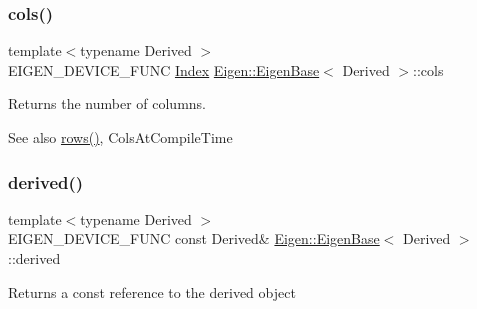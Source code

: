 \subsubsection{\texorpdfstring{cols()}{cols()}}
{\footnotesize\ttfamily template$<$typename Derived $>$ \\
E\+I\+G\+E\+N\+\_\+\+D\+E\+V\+I\+C\+E\+\_\+\+F\+U\+NC \mbox{\hyperlink{struct_eigen_1_1_eigen_base_a554f30542cc2316add4b1ea0a492ff02}{Index}} \mbox{\hyperlink{struct_eigen_1_1_eigen_base}{Eigen\+::\+Eigen\+Base}}$<$ Derived $>$\+::cols\hspace{0.3cm}{\ttfamily [inline]}}

\begin{DoxyReturn}{Returns}
the number of columns. 
\end{DoxyReturn}
\begin{DoxySeeAlso}{See also}
\mbox{\hyperlink{struct_eigen_1_1_eigen_base_a8141320ba8df384426c298b32b000d8e}{rows()}}, Cols\+At\+Compile\+Time 
\end{DoxySeeAlso}
\mbox{\label{class_eigen_1_1_dense_coeffs_base_3_01_derived_00_01_write_accessors_01_4_ad0cbee5e2dfef3bbe9db5e6d5fe12cc0}} 
\subsubsection{\texorpdfstring{derived()}{derived()}\hspace{0.1cm}{\footnotesize\ttfamily [1/2]}}
{\footnotesize\ttfamily template$<$typename Derived $>$ \\
E\+I\+G\+E\+N\+\_\+\+D\+E\+V\+I\+C\+E\+\_\+\+F\+U\+NC const Derived\& \mbox{\hyperlink{struct_eigen_1_1_eigen_base}{Eigen\+::\+Eigen\+Base}}$<$ Derived $>$\+::derived\hspace{0.3cm}{\ttfamily [inline]}}

\begin{DoxyReturn}{Returns}
a const reference to the derived object 
\end{DoxyReturn}
\mbox{\label{class_eigen_1_1_dense_coeffs_base_3_01_derived_00_01_write_accessors_01_4_a324b16961a11d2ecfd2d1b7dd7946545}} 
